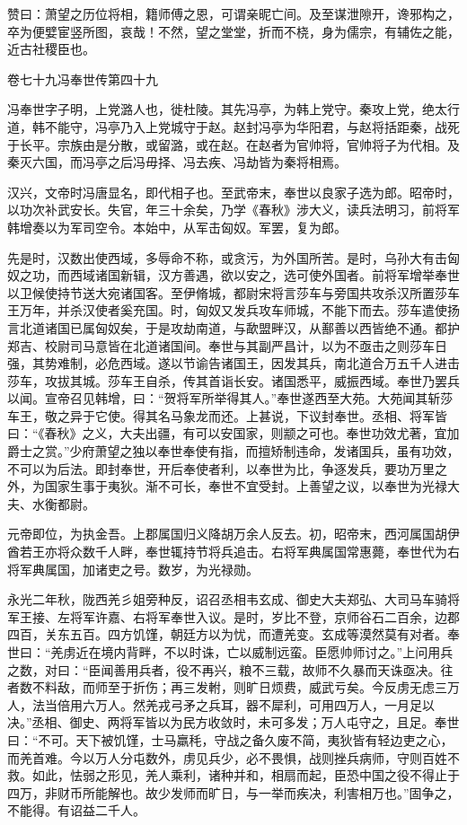 \documentclass[12pt,UTF8]{ctexbook}
\begin{document}
赞曰：萧望之历位将相，籍师傅之恩，可谓亲昵亡间。及至谋泄隙开，谗邪构之，卒为便嬖宦竖所图，哀哉！不然，望之堂堂，折而不桡，身为儒宗，有辅佐之能，近古社稷臣也。





卷七十九冯奉世传第四十九



冯奉世字子明，上党潞人也，徙杜陵。其先冯亭，为韩上党守。秦攻上党，绝太行道，韩不能守，冯亭乃入上党城守于赵。赵封冯亭为华阳君，与赵将括距秦，战死于长平。宗族由是分散，或留潞，或在赵。在赵者为官帅将，官帅将子为代相。及秦灭六国，而冯亭之后冯毋择、冯去疾、冯劫皆为秦将相焉。



汉兴，文帝时冯唐显名，即代相子也。至武帝末，奉世以良家子选为郎。昭帝时，以功次补武安长。失官，年三十余矣，乃学《春秋》涉大义，读兵法明习，前将军韩增奏以为军司空令。本始中，从军击匈奴。军罢，复为郎。



先是时，汉数出使西域，多辱命不称，或贪污，为外国所苦。是时，乌孙大有击匈奴之功，而西域诸国新辑，汉方善遇，欲以安之，选可使外国者。前将军增举奉世以卫候使持节送大宛诸国客。至伊脩城，都尉宋将言莎车与旁国共攻杀汉所置莎车王万年，并杀汉使者奚充国。时，匈奴又发兵攻车师城，不能下而去。莎车遣使扬言北道诸国已属匈奴矣，于是攻劫南道，与歃盟畔汉，从鄯善以西皆绝不通。都护郑吉、校尉司马意皆在北道诸国间。奉世与其副严昌计，以为不亟击之则莎车日强，其势难制，必危西域。遂以节谕告诸国王，因发其兵，南北道合万五千人进击莎车，攻拔其城。莎车王自杀，传其首诣长安。诸国悉平，威振西域。奉世乃罢兵以闻。宣帝召见韩增，曰：“贺将军所举得其人。”奉世遂西至大苑。大苑闻其斩莎车王，敬之异于它使。得其名马象龙而还。上甚说，下议封奉世。丞相、将军皆曰：“《春秋》之义，大夫出疆，有可以安国家，则颛之可也。奉世功效尤著，宜加爵士之赏。”少府萧望之独以奉世奉使有指，而擅矫制违命，发诸国兵，虽有功效，不可以为后法。即封奉世，开后奉使者利，以奉世为比，争逐发兵，要功万里之外，为国家生事于夷狄。渐不可长，奉世不宜受封。上善望之议，以奉世为光禄大夫、水衡都尉。



元帝即位，为执金吾。上郡属国归义降胡万余人反去。初，昭帝末，西河属国胡伊酋若王亦将众数千人畔，奉世辄持节将兵追击。右将军典属国常惠薨，奉世代为右将军典属国，加诸吏之号。数岁，为光禄勋。



永光二年秋，陇西羌彡姐旁种反，诏召丞相韦玄成、御史大夫郑弘、大司马车骑将军王接、左将军许嘉、右将军奉世入议。是时，岁比不登，京师谷石二百余，边郡四百，关东五百。四方饥馑，朝廷方以为忧，而遭羌变。玄成等漠然莫有对者。奉世曰：“羌虏近在境内背畔，不以时诛，亡以威制远蛮。臣愿帅师讨之。”上问用兵之数，对曰：“臣闻善用兵者，役不再兴，粮不三载，故师不久暴而天诛亟决。往者数不料敌，而师至于折伤；再三发軵，则旷日烦费，威武亏矣。今反虏无虑三万人，法当倍用六万人。然羌戎弓矛之兵耳，器不犀利，可用四万人，一月足以决。”丞相、御史、两将军皆以为民方收敛时，未可多发；万人屯守之，且足。奉世曰：“不可。天下被饥馑，士马羸秏，守战之备久废不简，夷狄皆有轻边吏之心，而羌首难。今以万人分屯数外，虏见兵少，必不畏惧，战则挫兵病师，守则百姓不救。如此，怯弱之形见，羌人乘利，诸种并和，相扇而起，臣恐中国之役不得止于四万，非财币所能解也。故少发师而旷日，与一举而疾决，利害相万也。”固争之，不能得。有诏益二千人。
\end{document}
